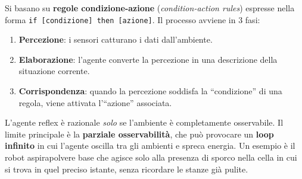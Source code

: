 Si basano su \textbf{regole condizione-azione} (\textit{condition-action rules}) espresse nella forma \texttt{if [condizione] then [azione]}. Il processo avviene in 3 fasi:
\begin{enumerate}
    \item \textbf{Percezione}: i sensori catturano i dati dall'ambiente.
    \item \textbf{Elaborazione}: l'agente converte la percezione in una descrizione della situazione corrente.
    \item \textbf{Corrispondenza}: quando la percezione soddisfa la ``condizione'' di una regola, viene attivata l'``azione'' associata.
\end{enumerate}

L'agente reflex è razionale \emph{solo} se l'ambiente è completamente osservabile. Il limite principale è la \textbf{parziale osservabilità}, che può provocare un \textbf{loop infinito} in cui l'agente oscilla tra gli ambienti e spreca energia. Un esempio è il robot aspirapolvere base che agisce solo alla presenza di sporco nella cella in cui si trova in quel preciso istante, senza ricordare le stanze già pulite.

